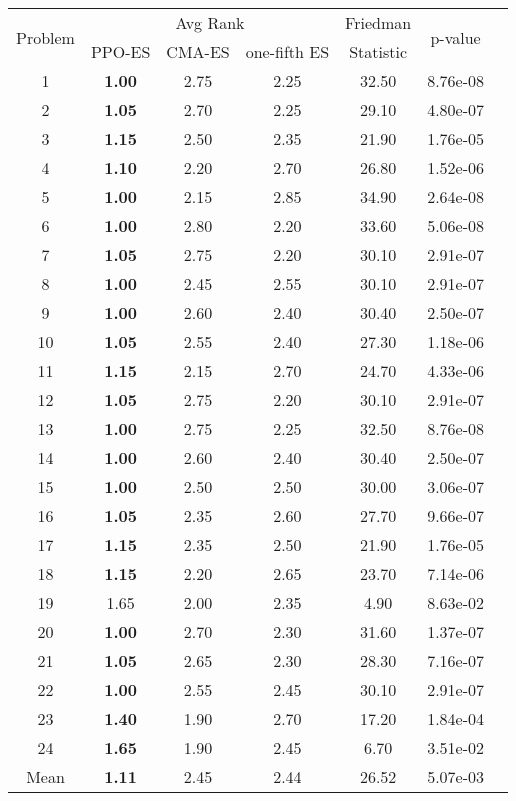 
        \begin{tabular}{ccccccc}
        \toprule
        \multirow{2}{*}{Problem} & \multicolumn{3}{c}{Avg Rank} & Friedman & \multirow{2}{*}{p-value} \\
        \cline{2-4}
        & PPO-ES & CMA-ES & one-fifth ES & Statistic & \\
        \midrule
        1 & \textbf{1.00} & 2.75 & 2.25 & 32.50 & 8.76e-08 \\
2 & \textbf{1.05} & 2.70 & 2.25 & 29.10 & 4.80e-07 \\
3 & \textbf{1.15} & 2.50 & 2.35 & 21.90 & 1.76e-05 \\
4 & \textbf{1.10} & 2.20 & 2.70 & 26.80 & 1.52e-06 \\
5 & \textbf{1.00} & 2.15 & 2.85 & 34.90 & 2.64e-08 \\
6 & \textbf{1.00} & 2.80 & 2.20 & 33.60 & 5.06e-08 \\
7 & \textbf{1.05} & 2.75 & 2.20 & 30.10 & 2.91e-07 \\
8 & \textbf{1.00} & 2.45 & 2.55 & 30.10 & 2.91e-07 \\
9 & \textbf{1.00} & 2.60 & 2.40 & 30.40 & 2.50e-07 \\
10 & \textbf{1.05} & 2.55 & 2.40 & 27.30 & 1.18e-06 \\
11 & \textbf{1.15} & 2.15 & 2.70 & 24.70 & 4.33e-06 \\
12 & \textbf{1.05} & 2.75 & 2.20 & 30.10 & 2.91e-07 \\
13 & \textbf{1.00} & 2.75 & 2.25 & 32.50 & 8.76e-08 \\
14 & \textbf{1.00} & 2.60 & 2.40 & 30.40 & 2.50e-07 \\
15 & \textbf{1.00} & 2.50 & 2.50 & 30.00 & 3.06e-07 \\
16 & \textbf{1.05} & 2.35 & 2.60 & 27.70 & 9.66e-07 \\
17 & \textbf{1.15} & 2.35 & 2.50 & 21.90 & 1.76e-05 \\
18 & \textbf{1.15} & 2.20 & 2.65 & 23.70 & 7.14e-06 \\
19 & 1.65 & 2.00 & 2.35 & 4.90 & 8.63e-02 \\
20 & \textbf{1.00} & 2.70 & 2.30 & 31.60 & 1.37e-07 \\
21 & \textbf{1.05} & 2.65 & 2.30 & 28.30 & 7.16e-07 \\
22 & \textbf{1.00} & 2.55 & 2.45 & 30.10 & 2.91e-07 \\
23 & \textbf{1.40} & 1.90 & 2.70 & 17.20 & 1.84e-04 \\
24 & \textbf{1.65} & 1.90 & 2.45 & 6.70 & 3.51e-02 \\
\midrule
Mean & \textbf{1.11} & 2.45 & 2.44 & 26.52 & 5.07e-03 \\
\bottomrule
\end{tabular}
